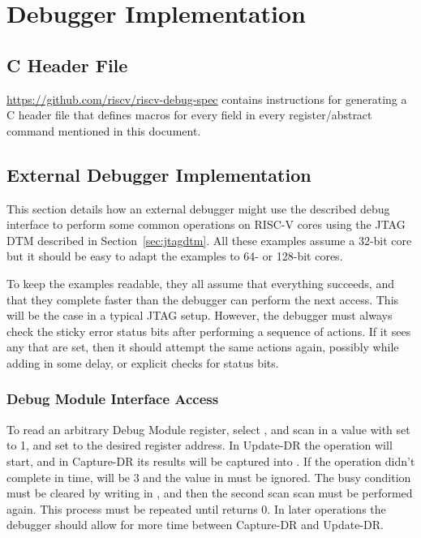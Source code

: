 \chapter{Debugger Implementation}

\section{C Header File}

\href{https://github.com/riscv/riscv-debug-spec}
{https://github.com/riscv/riscv-debug-spec} contains instructions for generating
a C header file that defines macros for every field in every register/abstract
command mentioned in this document.

\section{External Debugger Implementation}

This section details how an external debugger might use the described debug
interface to perform some common operations on RISC-V cores using the JTAG DTM
described in Section~\ref{sec:jtagdtm}.
All these examples assume a 32-bit core but it should be easy to adapt the
examples to 64- or 128-bit cores.

To keep the examples readable, they all assume that everything succeeds, and
that they complete faster than the debugger can perform the next access. This
will be the case in a typical JTAG setup. However, the debugger must always
check the sticky error status bits after performing a sequence of actions. If
it sees any that are set, then it should attempt the same actions again,
possibly while adding in some delay, or explicit checks for status bits.

\subsection{Debug Module Interface Access} \label{dmiaccess}

To read an arbitrary Debug Module register, select \RdtmDmi, and scan in a value
with \FdtmDmiOp set to 1, and \FdmSbaddressZeroAddress set to the desired register address. In
Update-DR the operation will start, and in Capture-DR its results will be
captured into \FdmSbdataZeroData.  If the operation didn't complete in time, \FdtmDmiOp will be 3
and the value in \FdmSbdataZeroData must be ignored. The busy condition must be cleared by
writing \FdtmDtmcsDmireset in \RdtmDtmcs, and then the second scan scan must be performed again.
This process must be repeated until \FdtmDmiOp returns 0.
In later operations the debugger should allow for more time between Capture-DR and
Update-DR.

